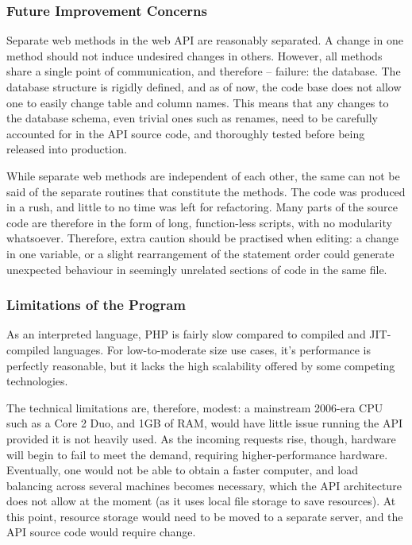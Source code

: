     \subsubsection{Future Improvement Concerns}

	Separate web methods in the web API are reasonably separated. A change
	in one method should not induce undesired changes in others. However, all
	methods share a single point of communication, and therefore -- failure:
	the database. The database structure is rigidly defined, and as of now,
	the code base does not allow one to easily change table and column names.
	This means that any changes to the database schema, even trivial ones such
	as renames, need to be carefully accounted for in the API source code, and
	thoroughly tested before being released into production.
	
	While separate web methods are independent of each other, the same can not
	be said of the separate routines that constitute the methods. The code was
	produced in a rush, and little to no time was left for refactoring. Many
	parts of the source code are therefore in the form of long, function-less
	scripts, with no modularity whatsoever. Therefore, extra caution should be
	practised when editing: a change in one variable, or a slight rearrangement
	of the statement order could generate unexpected behaviour in seemingly 
	unrelated sections of code in the same file.

    \subsubsection{Limitations of the Program}
	As an interpreted language, PHP is fairly slow compared to compiled and
	JIT-compiled languages. For low-to-moderate size use cases, it's performance
	is perfectly reasonable, but it lacks the high scalability offered by some
	competing technologies. 
	
	The technical limitations are, therefore, modest: a mainstream 2006-era CPU
	such as a Core 2 Duo, and 1GB of RAM, would have little issue running the
	API provided it is not heavily used. As the incoming requests rise, though,
	hardware will begin to fail to meet the demand, requiring higher-performance
	hardware. Eventually, one would not be able to obtain a faster computer, 
	and load balancing across several machines becomes necessary, which the API 
	architecture does not allow at the moment (as it uses local file storage
	to save resources). At this point, resource storage would need to be moved 
	to a separate server, and the API source code would require change. 
	

